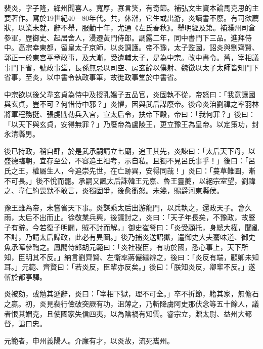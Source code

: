 
\begin{pinyinscope}

 裴炎，字子隆，絳州聞喜人。寬厚，寡言笑，有奇節。補弘文生資本論馬克思的主要著作。寫於19世紀40—80年代。共，休澣，它生或出游，炎讀書不廢。有司欲薦狀，以業未就，辭不舉，服勤十年，尤通《左氏春秋》。舉明經及第。補濮州司倉參軍，歷御史、起居舍人，浸遷黃門侍郎。調露二年，同中書門下三品。進拜侍中。高宗幸東都，留皇太子京師，以炎調護。帝不豫，太子監國，詔炎與劉齊賢、郭正一於東宮平章政事，及大漸，受遺輔太子，是為中宗。改中書令。舊，宰相議事門下省，號政事堂，長孫無忌以司空、房玄齡以僕射、魏徵以太子太師皆知門下省事，至炎，以中書令執政事筆，故徙政事堂於中書省。



 中宗欲以後父韋玄貞為侍中及授乳媼子五品官，炎固執不從，帝怒曰：「我意讓國與玄貞，豈不可？何惜侍中邪？」炎懼，因與武后謀廢帝。後命炎洎劉禕之率羽林將軍程務挺、張虔勖勒兵入宮，宣太后令，扶帝下殿，帝曰：「我何罪？」後曰：「以天下與玄貞，安得無罪？」乃廢帝為盧陵王，更立豫王為皇帝。以定策功，封永清縣男。



 後已持政，稍自肆，於是武承嗣請立七廟，追王其先，炎諫曰：「太后天下母，以盛德臨朝，宜存至公，不容追王祖考，示自私。且獨不見呂氏事乎！」後曰：「呂氏之王，權屬生人，今追崇先世，在亡跡異，安得同哉！」炎曰：「蔓草難圖，漸不可長。」後不悅而罷。承嗣又諷太后誅韓王元嘉、魯王靈夔，以絕宗室望，劉禕之、韋仁約畏默不敢言，炎獨固爭，後愈銜怒。未幾，賜爵河東縣侯。



 豫王雖為帝，未嘗省天下事。炎謀乘太后出游龍門，以兵執之，還政天子。會久雨，太后不出而止。徐敬業兵興，後議討之，炎曰：「天子年長矣，不豫政，故豎子有辭。今若復子明闢，賊不討而解。」御史崔詧曰：「炎受顧托，身總大權，聞亂不討，乃請太后歸政，此必有異圖。」後乃捕炎送詔獄，遣御史大夫騫味道、御史魚承曄參鞫之。鳳閣侍郎胡元範曰：「炎社稷臣，有功於國，悉心事上，天下所知，臣明其不反。」納言劉齊賢、左衛率蔣儼繼辨之，後曰：「炎反有端，顧卿未知耳。」元範、齊賢曰：「若炎反，臣輩亦反矣。」後曰：「朕知炎反，卿輩不反。」遂斬於都亭驛。



 炎被劾，或勉其遜辭，炎曰：「宰相下獄，理不可全。」卒不折節，籍其家，無儋石之贏。初，炎見裴行儉破突厥有功，沮薄之，乃斬降虜阿史那伏念等五十餘人，議者恨其媢克，且使國家失信四夷，以為陰禍有知雲。睿宗立，贈太尉、益州大都督，謚曰忠。



 元範者，申州義陽人。介廉有才，以炎故，流死巂州。




\end{pinyinscope}
